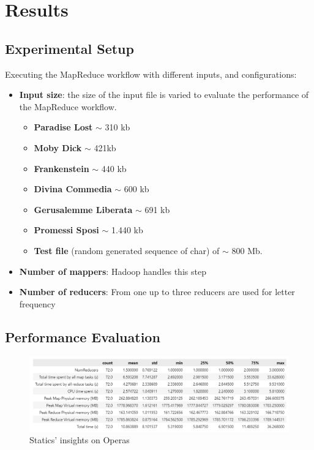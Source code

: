\newpage
\section{Results}
\subsection{Experimental Setup}
Executing the MapReduce workflow with different inputs, and configurations:
\begin{itemize}
  \item \textbf{Input size}: the size of the input file is varied to evaluate the performance of the MapReduce workflow.
        \begin{itemize}
          \item \textbf{Paradise Lost} $\sim$ 310 kb
          \item \textbf{Moby Dick} $\sim$ 421kb
          \item \textbf{Frankenstein} $\sim$ 440 kb
          \item \textbf{Divina Commedia} $\sim$ 600 kb
          \item \textbf{Gerusalemme Liberata} $\sim$ 691 kb
          \item \textbf{Promessi Sposi} $\sim$ 1.440 kb
          \item \textbf{Test file} (random generated sequence of char) of $\sim$ 800 Mb.
        \end{itemize}
  \item \textbf{Number of mappers}: Hadoop handles this step
  \item \textbf{Number of reducers}: From one up to three reducers are used for letter frequency
\end{itemize}

\subsection{Performance Evaluation}
\begin{figure}[H]
  \centering
  \includegraphics[width=\textwidth]{media/performance/opera_df_describe.png}
  \caption{Statics' insights on Operas}
  \label{fig:OperaInsights}
\end{figure}

